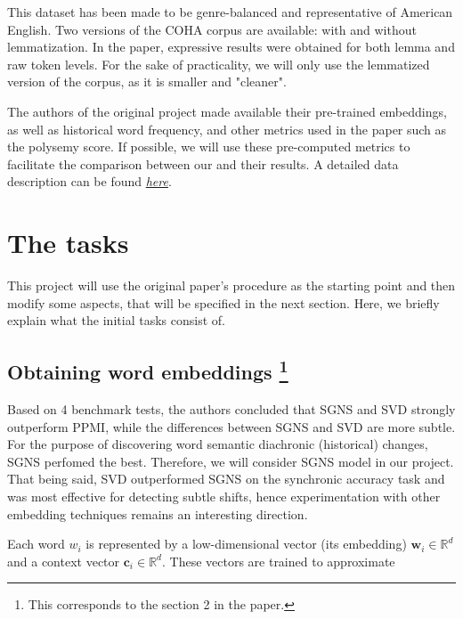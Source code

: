 \documentclass[11pt, twocolumn]{extarticle}
\newcommand{\word}[1]{w_{#1}}
\newcommand{\emb}[1]{\mathbf{w}_{#1}}
\newcommand{\ctx}[1]{\mathbf{c}_{#1}}
\begin{document}
This dataset has been made to be genre-balanced and representative of American English. Two versions of the COHA corpus are available: with and without lemmatization. In the paper, expressive results were obtained for both lemma and raw token levels. For the sake of practicality, we will only use the lemmatized version of the corpus, as it is smaller and "cleaner".
\par

The authors of the original project made available their pre-trained embeddings, as well as historical word frequency, and other metrics used in the paper such as the polysemy score. If possible, we will use these pre-computed metrics to facilitate the comparison between our and their results. A detailed data description can be found \href{https://nlp.stanford.edu/projects/histwords/data_description.html}{\textit{here}}.  
\par

\section{The tasks}

This project will use the original paper's procedure as the starting point and then modify some aspects, that will be specified in the next section. Here, we briefly explain what the initial tasks consist of. 
\par

\subsection*{Obtaining word embeddings \footnote{This corresponds to the section 2 in the paper.}}

Based on 4 benchmark tests, the authors \cite{hamilton-etal-2016-diachronic} concluded that SGNS and SVD strongly outperform PPMI, while the differences between SGNS and SVD are more subtle. For the purpose of discovering word semantic diachronic (historical) changes, SGNS perfomed the best. Therefore, we will consider SGNS model in our project. That being said, SVD outperformed SGNS on the synchronic accuracy task and was most effective for detecting subtle shifts, hence experimentation with other embedding techniques remains an interesting direction.
\par

Each word $\word{i}$ is represented by a low-dimensional vector (its embedding) $\emb{i} \in \mathbb{R}^{d}$  and a context vector $\ctx{i} \in \mathbb{R}^{d}$. These vectors are trained to approximate
\end{document}
